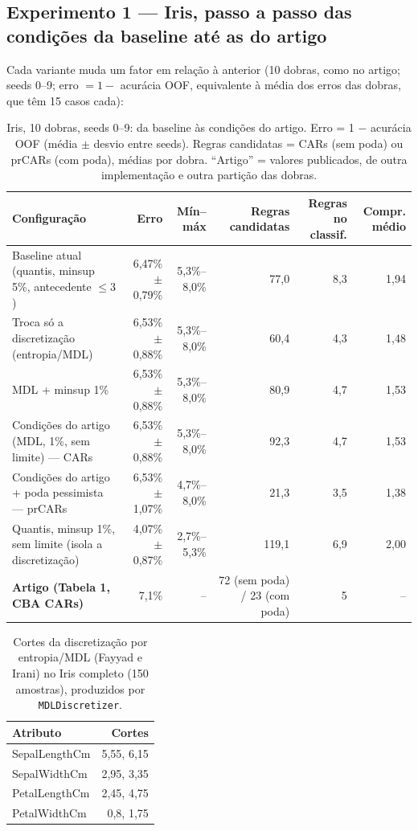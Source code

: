 \documentclass[a4paper,11pt]{article}
\begin{document}
\subsection{Experimento 1 --- Iris, passo a passo das condições da baseline até as do artigo}
Cada variante muda um fator em relação à anterior (10 dobras, como no artigo; seeds 0--9; erro $=1-$ acurácia OOF, equivalente à média dos erros das dobras, que têm 15 casos cada):
\begin{table}[htbp]
\centering
\small
\caption{Iris, 10 dobras, seeds 0--9: da baseline às condições do artigo. Erro = 1 $-$ acurácia OOF (média $\pm$ desvio entre seeds). Regras candidatas = CARs (sem poda) ou prCARs (com poda), médias por dobra. ``Artigo'' = valores publicados, de outra implementação e outra partição das dobras.}
\label{tab:fid_iris}
\begin{tabular}{p{5.6cm}rrrrr}
\toprule
Configuração & Erro & Mín--máx & Regras candidatas & Regras no classif. & Compr. médio \\
\midrule
Baseline atual (quantis, minsup 5\%, antecedente $\leq 3$) & 6,47\% $\pm$ 0,79\% & 5,3\%--8,0\% & 77,0 & 8,3 & 1,94 \\
Troca só a discretização (entropia/MDL) & 6,53\% $\pm$ 0,88\% & 5,3\%--8,0\% & 60,4 & 4,3 & 1,48 \\
MDL + minsup 1\% & 6,53\% $\pm$ 0,88\% & 5,3\%--8,0\% & 80,9 & 4,7 & 1,53 \\
Condições do artigo (MDL, 1\%, sem limite) --- CARs & 6,53\% $\pm$ 0,88\% & 5,3\%--8,0\% & 92,3 & 4,7 & 1,53 \\
Condições do artigo + poda pessimista --- prCARs & 6,53\% $\pm$ 1,07\% & 4,7\%--8,0\% & 21,3 & 3,5 & 1,38 \\
Quantis, minsup 1\%, sem limite (isola a discretização) & 4,07\% $\pm$ 0,87\% & 2,7\%--5,3\% & 119,1 & 6,9 & 2,00 \\
\textbf{Artigo (Tabela 1, CBA CARs)} & 7,1\% & -- & 72 (sem poda) / 23 (com poda) & 5 & -- \\
\bottomrule
\end{tabular}
\end{table}

\begin{table}[htbp]
\centering
\small
\caption{Cortes da discretização por entropia/MDL (Fayyad e Irani) no Iris completo (150 amostras), produzidos por \texttt{MDLDiscretizer}.}
\label{tab:fid_cortes}
\begin{tabular}{lr}
\toprule
Atributo & Cortes \\
\midrule
SepalLengthCm & 5,55, 6,15 \\
SepalWidthCm & 2,95, 3,35 \\
PetalLengthCm & 2,45, 4,75 \\
PetalWidthCm & 0,8, 1,75 \\
\bottomrule
\end{tabular}
\end{table}
\end{document}

